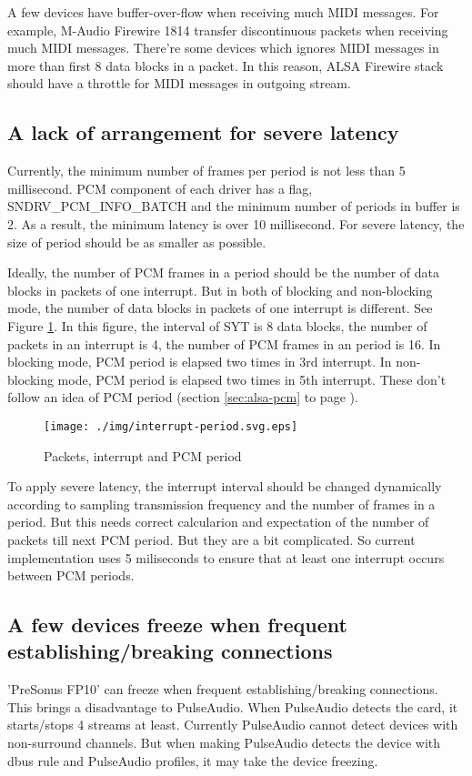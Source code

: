 \documentclass[onecolumn]{article}
\begin{document}
A few devices have buffer-over-flow when receiving much MIDI messages. For example, M-Audio Firewire 1814 transfer discontinuous packets when receiving much MIDI messages. There're some devices which ignores MIDI messages in more than first 8 data blocks in a packet.
In this reason, ALSA Firewire stack should have a throttle for MIDI messages in outgoing stream.

\subsection{A lack of arrangement for severe latency}
Currently, the minimum number of frames per period is not less than 5 millisecond. PCM component of each driver has a flag, SNDRV\_PCM\_INFO\_BATCH and the minimum number of periods in buffer is 2. As a result, the minimum latency is over 10 millisecond. For severe latency, the size of period should be as smaller as possible.

Ideally, the number of PCM frames in a period should be the number of data blocks in packets of one interrupt. But in both of blocking and non-blocking mode, the number of data blocks in packets of one interrupt is different. See Figure \ref{fig:interrupt-period}. In this figure, the interval of SYT is 8 data blocks, the number of packets in an interrupt is 4, the number of PCM frames in an period is 16. In blocking mode, PCM period is elapsed two times in 3rd interrupt. In non-blocking mode, PCM period is elapsed two times in 5th interrupt. These don't follow an idea of PCM period (section \ref{sec:alsa-pcm} to page \pageref{sec:alsa-pcm}).

\begin{figure}[H]
	\centering
	\texttt{[image: ./img/interrupt-period.svg.eps]}
	\caption{{Packets, interrupt and PCM period}}
	\label{fig:interrupt-period}
\end{figure}

To apply severe latency, the interrupt interval should be changed dynamically according to sampling transmission frequency and the number of frames in a period. But this needs correct calcularion and expectation of the number of packets till next PCM period. But they are a bit complicated. So current implementation uses 5 miliseconds to ensure that at least one interrupt occurs between PCM periods.


\subsection{A few devices freeze when frequent establishing/breaking connections}
'PreSonus FP10' can freeze when frequent establishing/breaking connections. This brings a disadvantage to PulseAudio. When PulseAudio detects the card, it starts/stops 4 streams at least. Currently PulseAudio cannot detect devices with non-surround channels. But when making PulseAudio detects the device with dbus rule and PulseAudio profiles, it may take the device freezing.
\end{document}
